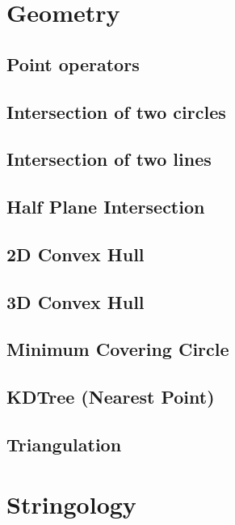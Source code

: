 \documentclass[a4paper,10pt,twocolumn,oneside]{article}
\begin{document}
\section{Geometry}
\subsection{Point operators}

\subsection{Intersection of two circles}

\subsection{Intersection of two lines}

\subsection{Half Plane Intersection}

\subsection{2D Convex Hull}

\subsection{3D Convex Hull}

\subsection{Minimum Covering Circle}

\subsection{KDTree (Nearest Point)}

\subsection{Triangulation}


\section{Stringology}
\end{document}
